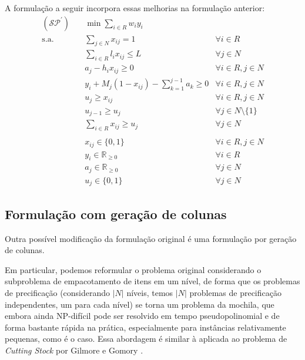 \documentclass{article}
\begin{document}
A formulação a seguir incorpora essas melhorias na formulação anterior:
\begin{align*}
    (\mathcal{SP}^\prime)\quad
     & \min \sum_{i \in R} w_i y_i\nonumber                                                         \\
    \text{s.a.}\quad
     & \sum_{j \in N} x_{ij} = 1                                & \forall i \in R                   \\
     & \sum_{i \in R} l_i x_{ij} \leq L                         & \forall j \in N                   \\
     & a_j - h_i x_{ij} \geq 0                                  & \forall i \in R, j \in N          \\
     & y_i + M_j (1 - x_{ij}) - \sum_{k = 1}^{j - 1} a_k \geq 0 & \forall i \in R, j \in N          \\
     & u_j \geq x_{ij}                                          & \forall i \in R, j \in N          \\
     & u_{j-1} \geq u_j                                         & \forall j \in N \setminus \{1\}   \\
     & \sum_{i \in R} x_{ij} \geq u_j                           & \forall j \in N                   \\
    \nonumber                                                                                       \\
     & x_{ij} \in \{0, 1\}                                      & \forall i \in R, j \in N\nonumber \\
     & y_i \in \mathbb{R}_{\geq 0}                              & \forall i \in R\nonumber          \\
     & a_j \in \mathbb{R}_{\geq 0}                              & \forall j \in N\nonumber          \\
     & u_j \in \{0, 1\}                                         & \forall j \in N\nonumber
\end{align*}

\subsection{Formulação com geração de colunas}

Outra possível modificação da formulação original é uma formulação por geração de colunas.

Em particular, podemos reformular o problema original considerando o subproblema de empacotamento de itens em um nível, de forma que os problemas de precificação (considerando $|N|$ níveis, temos $|N|$ problemas de precificação independentes, um para cada nível) se torna um problema da mochila, que embora ainda NP-difícil pode ser resolvido em tempo pseudopolinomial e de forma bastante rápida na prática, especialmente para instâncias relativamente pequenas, como é o caso. Essa abordagem é similar à aplicada ao problema de {\it Cutting Stock} por Gilmore e Gomory \cite{gilmore-gomory}.
\end{document}
